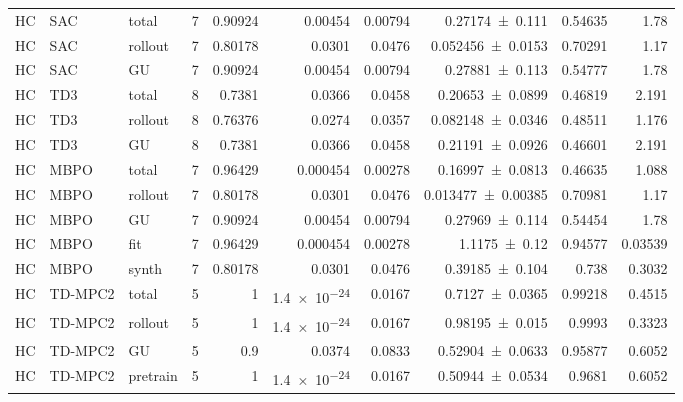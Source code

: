 {\begin{longtable}{@{}lllrrrrrrr@{}}
    \midrule
    HC & SAC & total & \num{7} & \num{0.90924} & \num{0.00454} & \num{0.00794} & \num{0.27174+-0.111} & \num{0.54635} & \num{1.78} \\
    HC & SAC & rollout & \num{7} & \num{0.80178} & \num{0.0301} & \num{0.0476} & \num{0.052456+-0.0153} & \num{0.70291} & \num{1.17} \\
    HC & SAC & GU & \num{7} & \num{0.90924} & \num{0.00454} & \num{0.00794} & \num{0.27881+-0.113} & \num{0.54777} & \num{1.78} \\
    HC & TD3 & total & \num{8} & \num{0.7381} & \num{0.0366} & \num{0.0458} & \num{0.20653+-0.0899} & \num{0.46819} & \num{2.191} \\
    HC & TD3 & rollout & \num{8} & \num{0.76376} & \num{0.0274} & \num{0.0357} & \num{0.082148+-0.0346} & \num{0.48511} & \num{1.176} \\
    HC & TD3 & GU & \num{8} & \num{0.7381} & \num{0.0366} & \num{0.0458} & \num{0.21191+-0.0926} & \num{0.46601} & \num{2.191} \\
    HC & MBPO & total & \num{7} & \num{0.96429} & \num{0.000454} & \num{0.00278} & \num{0.16997+-0.0813} & \num{0.46635} & \num{1.088} \\
    HC & MBPO & rollout & \num{7} & \num{0.80178} & \num{0.0301} & \num{0.0476} & \num{0.013477+-0.00385} & \num{0.70981} & \num{1.17} \\
    HC & MBPO & GU & \num{7} & \num{0.90924} & \num{0.00454} & \num{0.00794} & \num{0.27969+-0.114} & \num{0.54454} & \num{1.78} \\
    HC & MBPO & fit & \num{7} & \num{0.96429} & \num{0.000454} & \num{0.00278} & \num{1.1175+-0.12} & \num{0.94577} & \num{0.03539} \\
    HC & MBPO & synth & \num{7} & \num{0.80178} & \num{0.0301} & \num{0.0476} & \num{0.39185+-0.104} & \num{0.738} & \num{0.3032} \\
    HC & TD-MPC2 & total & \num{5} & \num{1} & \num{1.4e-24} & \num{0.0167} & \num{0.7127+-0.0365} & \num{0.99218} & \num{0.4515} \\
    HC & TD-MPC2 & rollout & \num{5} & \num{1} & \num{1.4e-24} & \num{0.0167} & \num{0.98195+-0.015} & \num{0.9993} & \num{0.3323} \\
    HC & TD-MPC2 & GU & \num{5} & \num{0.9} & \num{0.0374} & \num{0.0833} & \num{0.52904+-0.0633} & \num{0.95877} & \num{0.6052} \\
    HC & TD-MPC2 & pretrain & \num{5} & \num{1} & \num{1.4e-24} & \num{0.0167} & \num{0.50944+-0.0534} & \num{0.9681} & \num{0.6052} \\

\end{longtable}}
